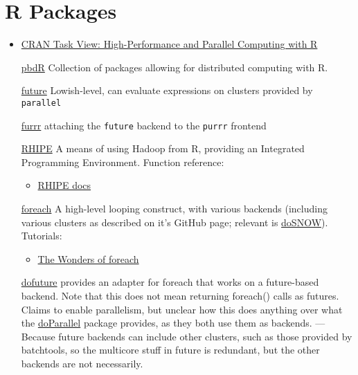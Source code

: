\documentclass[a4paper, 11pt]{article}
\begin{document}
\section{R Packages}
\label{sec:orgfe65358}
\begin{itemize}
\item \href{https://cran.r-project.org/web/views/HighPerformanceComputing.html}{CRAN Task View: High-Performance and Parallel Computing with R}
\item[{\href{https://en.wikipedia.org/wiki/Programming\_with\_Big\_Data\_in\_R}{pbdR}}] Collection of packages allowing for distributed computing
with R.
\item[{\href{https://github.com/HenrikBengtsson/future}{future}}] Lowish-level, can evaluate expressions on clusters
provided by \texttt{parallel}
\item[{\href{https://github.com/DavisVaughan/furrr}{furrr}}] attaching the \texttt{future} backend to the \texttt{purrr} frontend
\item[{\href{https://github.com/delta-rho/rhipe}{RHIPE}}] A means of using Hadoop from R, providing an Integrated
Programming Environment. Function reference:
\begin{itemize}
\item \href{http://deltarho.org/docs-RHIPE/functionref.html}{RHIPE docs}
\end{itemize}
\item[{\href{https://github.com/RevolutionAnalytics/foreach}{foreach}}] A high-level looping construct, with various backends
(including various clusters as described on it's GitHub page;
relevant is \href{https://cran.r-project.org/web/packages/doSNOW/index.html}{doSNOW}). Tutorials:
\begin{itemize}
\item \href{https://www.r-bloggers.com/the-wonders-of-foreach/}{The Wonders of foreach}
\end{itemize}
\item[{\href{https://github.com/HenrikBengtsson/doFuture}{dofuture}}] provides an adapter for foreach that works on a
future-based backend. Note that this does not mean returning
foreach() calls as futures. Claims to enable parallelism, but
unclear how this does anything over what the \href{https://cran.r-project.org/web/packages/doParallel/index.html}{doParallel} package
provides, as they both use them as backends. --- Because future
backends can include other clusters, such as those provided by
batchtools, so the multicore stuff in future is redundant, but
the other backends are not necessarily.

\end{itemize}
\end{document}

